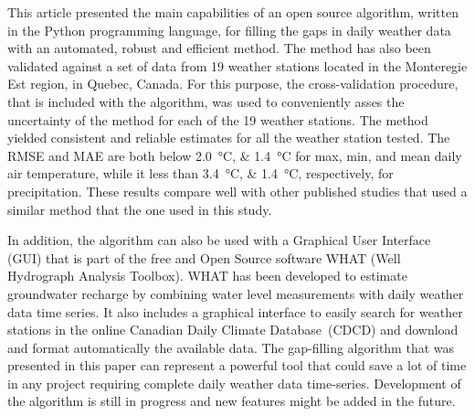 \documentclass[ARTICLETHERMIC.tex]{subfiles}
\begin{document}
This article presented the main capabilities of an open source algorithm, written in the Python programming language, for filling the gaps in daily weather data with an automated, robust and efficient method. The method has also been validated against a set of data from 19 weather stations located in the Monteregie Est region, in Quebec, Canada. For this purpose, the cross-validation procedure, that is included with the algorithm, was used to conveniently asses the uncertainty of the method for each of the 19 weather stations. The method yielded consistent and reliable estimates for all the weather station tested. The RMSE and MAE are both below \SIlist{2.0;1.4}{\celsius} for max, min, and mean daily air temperature, while it less than \SIlist{3.4;1.4}{\celsius}, respectively, for precipitation. These results compare well with other published studies that used a similar method that the one used in this study. 

In addition, the algorithm can also be used with a Graphical User Interface (GUI) that is part of the free and Open Source software WHAT (Well Hydrograph Analysis Toolbox). WHAT has been developed to estimate groundwater recharge by combining water level measurements with daily weather data time series. It also includes a graphical interface to easily search for weather stations in the online Canadian Daily Climate Database~(CDCD) and download and format automatically the available data. The gap-filling algorithm that was presented in this paper can represent a powerful tool that could save a lot of time in any project requiring complete daily weather data time-series. Development of the algorithm is still in progress and new features might be added in the future.
\end{document}
